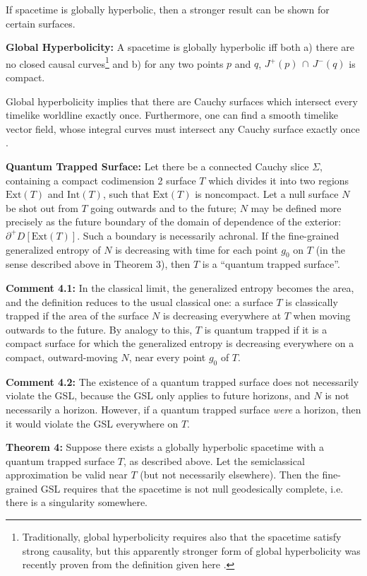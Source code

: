 \documentclass[12pt]{article}
\begin{document}
If spacetime is globally hyperbolic, then a stronger result can be shown for certain surfaces.

\textbf{Global Hyperbolicity:} A spacetime is globally hyperbolic iff both a) there are no closed causal curves\footnote{Traditionally, global hyperbolicity requires also that the spacetime satisfy strong causality, but this apparently stronger form of global hyperbolicity was recently proven from the definition given here \cite{BernalSanchez}.} and b) for any two points $p$ and $q$, $J^+(p)\,\cap\,J^-(q)$ is compact.

Global hyperbolicity implies that there are Cauchy surfaces which intersect every timelike worldline exactly once.  Furthermore, one can find a smooth timelike vector field, whose integral curves must intersect any Cauchy surface exactly once \cite{HawkingEllis}.

\textbf{Quantum Trapped Surface:} Let there be a connected Cauchy slice $\Sigma$, containing a compact codimension 2 surface $T$ which divides it into two regions $\mathrm{Ext}(T)$ and $\mathrm{Int}(T)$, such that $\mathrm{Ext}(T)$ is noncompact.  Let a null surface $N$ be shot out from $T$ going outwards and to the future; $N$ may be defined more precisely as the future boundary of the domain of dependence of the exterior: $\partial^+ D[\mathrm{Ext}(T)]$.  Such a boundary is necessarily achronal.  If the fine-grained generalized entropy of $N$ is decreasing with time for each point $g_0$ on $T$ (in the sense described above in Theorem 3), then $T$ is a ``quantum trapped surface''.

\textbf{Comment 4.1:} In the classical limit, the generalized entropy becomes the area, and the definition reduces to the usual classical one: a surface $T$ is classically trapped if the area of the surface $N$ is decreasing everywhere at $T$ when moving outwards to the future.   By analogy to this, $T$ is quantum trapped if it is a compact surface for which the generalized entropy is decreasing everywhere on a compact, outward-moving $N$, near every point $g_0$ of $T$.

\textbf{Comment 4.2:} The existence of a quantum trapped surface does not necessarily violate the GSL, because the GSL only applies to future horizons, and $N$ is not necessarily a horizon.  However, if a quantum trapped surface \emph{were} a horizon, then it would violate the GSL everywhere on $T$.

\textbf{Theorem 4:}  Suppose there exists a globally hyperbolic spacetime with a quantum trapped surface $T$, as described above.  Let the semiclassical approximation be valid near $T$ (but not necessarily elsewhere).  Then the fine-grained GSL requires that the spacetime is not null geodesically complete, i.e. there is a singularity somewhere.
\end{document}
